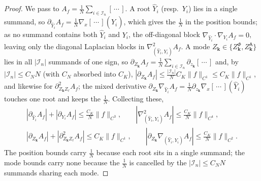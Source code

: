 \documentclass[a4paper,fleqn]{cas-sc}
\theoremstyle{definition}
\theoremstyle{remark}
\begin{document}
\begin{proof}
We pass to $A_f=\tfrac1N\sum_{i\in\mathcal I_n}[\,\cdots\,]$. A root $\widehat Y_i$ (resp.\ $Y_i$) lies in a
single summand, so $\partial_{\widehat Y_i}A_f=\tfrac1N\nabla_x[\,\cdots\,](\widehat Y_i)$, which gives the
$\tfrac1N$ in the position bounds; as no summand contains both $\widehat Y_i$ and $Y_i$, the off-diagonal
block $\nabla_{\widehat Y_i}\!\cdot\!\nabla_{Y_i}A_f=0$, leaving only the diagonal Laplacian blocks in
$\nabla^2_{(\widehat Y_i,Y_i)}A_f$. A mode $Z_{\mathbf k}\in\{Z^\Phi_{\mathbf k},Z^{\mathsf A}_{\mathbf k}\}$ lies in
all $|\mathcal I_n|$ summands of one sign, so
$\partial_{Z_{\mathbf k}}A_f=\tfrac1N\sum_{i\in\mathcal I_n}\partial_{z_{\mathbf k}}[\,\cdots\,]$ and, by
$|\mathcal I_n|\le C_NN$ (with $C_N$ absorbed into $C_K$),
$|\partial_{Z_{\mathbf k}}A_f|\le\tfrac{|\mathcal I_n|}N C_K\|f\|_{C^1}\le C_K\|f\|_{C^1}$, and likewise for
$\partial^2_{Z_{\mathbf k}Z_\ell}A_f$; the mixed derivative
$\partial_{Z_{\mathbf k}}\nabla_{\widehat Y_i}A_f=\tfrac1N\partial_{z_{\mathbf k}}\nabla_x[\,\cdots\,](\widehat Y_i)$
touches one root and keeps the $\tfrac1N$. Collecting these,
\begin{equation}\label{eq:L4-derivs}
\begin{gathered}
|\partial_{\widehat Y_i}A_f|+|\partial_{Y_i}A_f|\le\tfrac{C_K}N\|f\|_{C^3},\qquad
|\nabla^2_{(\widehat Y_i,Y_i)}A_f|\le\tfrac{C_K}N\|f\|_{C^4},\\[2pt]
|\partial_{Z_{\mathbf k}}A_f|+|\partial^2_{Z_{\mathbf k}Z_\ell}A_f|\le C_K\|f\|_{C^1},\qquad
|\partial_{Z_{\mathbf k}}\nabla_{(\widehat Y_i,Y_i)}A_f|\le\tfrac{C_K}N\|f\|_{C^2}.
\end{gathered}
\end{equation}
The position bounds carry $\tfrac1N$ because each root sits in a single summand; the mode bounds carry
none because the $\tfrac1N$ is cancelled by the $|\mathcal I_n|\le C_NN$ summands sharing each mode.


\end{proof}
\end{document}
